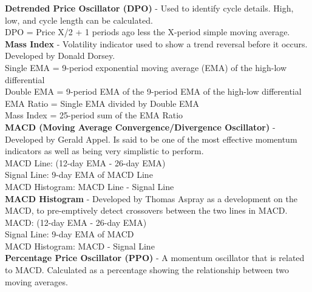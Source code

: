 \documentclass[12pt,a4paper]{article}
\begin{document}
\iffalse
[]
\fi

\noindent
\textbf{Detrended Price Oscillator (DPO)} - Used to identify cycle details. High, low, and cycle length can be calculated.\\

\noindent
DPO = Price {X/2 + 1} periods ago less the X-period simple moving average.\\

\iffalse
[]
\fi

\noindent
\textbf{Mass Index} - Volatility indicator used to show a trend reversal before it occurs. Developed by Donald Dorsey. \\

\noindent
Single EMA = 9-period exponential moving average (EMA) of the high-low differential \\
Double EMA = 9-period EMA of the 9-period EMA of the high-low differential \\
EMA Ratio = Single EMA divided by Double EMA \\
Mass Index = 25-period sum of the EMA Ratio \\

\iffalse
[]
\fi

\noindent
\textbf{MACD (Moving Average Convergence/Divergence Oscillator)} - Developed by Gerald Appel. Is said to be one of the most effective momentum indicators as well as being very simplistic to perform. \\

\noindent
MACD Line: (12-day EMA - 26-day EMA)\\
Signal Line: 9-day EMA of MACD Line\\
MACD Histogram: MACD Line - Signal Line\\

\iffalse
[]
\fi

\noindent
\textbf{MACD Histogram} - Developed by Thomas Aspray as a development on the MACD, to pre-emptively detect crossovers between the two lines in MACD.\\

\noindent
MACD: (12-day EMA - 26-day EMA) \\
Signal Line: 9-day EMA of MACD \\
MACD Histogram: MACD - Signal Line \\

\iffalse
[]
\fi

\noindent
\textbf{Percentage Price Oscillator (PPO)} - A momentum oscillator that is related to MACD. Calculated as a percentage showing the relationship between two moving averages. \\
\end{document}
